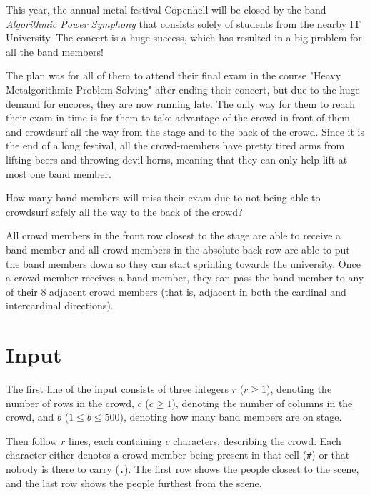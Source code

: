 

This year, the annual metal festival Copenhell will be closed by the band \textit{Algorithmic Power Symphony} that consists solely of students from the nearby IT University. The concert is a huge success, which has resulted in a big problem for all the band members!

The plan was for all of them to attend their final exam in the course "Heavy Metalgorithmic Problem Solving" after ending their concert, but due to the huge demand for encores, they are now running late. The only way for them to reach their exam in time is for them to take advantage of the crowd in front of them and crowdsurf all the way from the stage and to the back of the crowd. Since it is the end of a long festival, all the crowd-members have pretty tired arms from lifting beers and throwing devil-horns, meaning that they can only help lift at most one band member.

How many band members will miss their exam due to not being able to crowdsurf safely all the way to the back of the crowd?

All crowd members in the front row closest to the stage are able to receive a band member and all crowd members in the absolute back row are able to put the band members down so they can start sprinting towards the university.
Once a crowd member receives a band member, they can pass the band member to any of their 8 adjacent crowd members (that is, adjacent in both the cardinal and intercardinal directions).

\section*{Input}

The first line of the input consists of three integers $r$ ($r \geq 1$), denoting the number of rows in the crowd, $c$ ($c \geq 1$), denoting the number of columns in the crowd, and $b$ ($1 \leq b \leq 500$), denoting how many band members are on stage.

Then follow $r$ lines, each containing $c$ characters, describing the crowd. Each character either denotes a crowd member being present in that cell (\texttt{\#}) or that nobody is there to carry (\texttt{.}). The first row shows the people closest to the scene, and the last row shows the people furthest from the scene.

